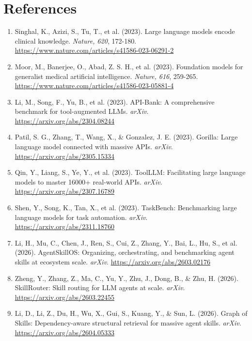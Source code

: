 \documentclass[11pt]{article}
\begin{document}
\section*{References}
\begin{enumerate}

\item Singhal, K., Azizi, S., Tu, T., et al. (2023). Large language models encode clinical knowledge. \textit{Nature, 620}, 172-180. \url{https://www.nature.com/articles/s41586-023-06291-2}

\item Moor, M., Banerjee, O., Abad, Z. S. H., et al. (2023). Foundation models for generalist medical artificial intelligence. \textit{Nature, 616}, 259-265. \url{https://www.nature.com/articles/s41586-023-05881-4}

\item Li, M., Song, F., Yu, B., et al. (2023). API-Bank: A comprehensive benchmark for tool-augmented LLMs. \textit{arXiv}. \url{https://arxiv.org/abs/2304.08244}

\item Patil, S. G., Zhang, T., Wang, X., \& Gonzalez, J. E. (2023). Gorilla: Large language model connected with massive APIs. \textit{arXiv}. \url{https://arxiv.org/abs/2305.15334}

\item Qin, Y., Liang, S., Ye, Y., et al. (2023). ToolLLM: Facilitating large language models to master 16000+ real-world APIs. \textit{arXiv}. \url{https://arxiv.org/abs/2307.16789}

\item Shen, Y., Song, K., Tan, X., et al. (2023). TaskBench: Benchmarking large language models for task automation. \textit{arXiv}. \url{https://arxiv.org/abs/2311.18760}

\item Li, H., Mu, C., Chen, J., Ren, S., Cui, Z., Zhang, Y., Bai, L., Hu, S., et al. (2026). AgentSkillOS: Organizing, orchestrating, and benchmarking agent skills at ecosystem scale. \textit{arXiv}. \url{https://arxiv.org/abs/2603.02176}

\item Zheng, Y., Zhang, Z., Ma, C., Yu, Y., Zhu, J., Dong, B., \& Zhu, H. (2026). SkillRouter: Skill routing for LLM agents at scale. \textit{arXiv}. \url{https://arxiv.org/abs/2603.22455}

\item Li, D., Li, Z., Du, H., Wu, X., Gui, S., Kuang, Y., \& Sun, L. (2026). Graph of Skills: Dependency-aware structural retrieval for massive agent skills. \textit{arXiv}. \url{https://arxiv.org/abs/2604.05333}


\end{enumerate}
\end{document}
